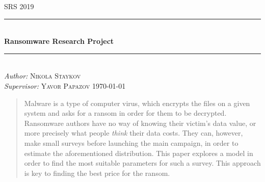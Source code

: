 \documentclass[11pt, a4paper]{article}
\theoremstyle{definition}
\begin{document}
\begin{titlepage}
	\newcommand{\HRule}{\rule{\linewidth}{0.5mm}}
	\centering
	\textsc{\LARGE SRS 2019}\\[1cm]
	\HRule\\[1 cm]
	
	{\huge\bfseries Ransomware Research Project }\\[0.5 cm] 
	\HRule\\
    \vfill
			\Large
			\textit{Author:}
			 \textsc{Nikola Staykov}\\
             \vspace{2cm}
			\Large
			\textit{Supervisor:}
            \textsc{Yavor Papazov}
    \vfill	
	{\large\today}   
	\vfill
\end{titlepage}

\tableofcontents
\newpage
\begin{abstract}
		Malware is a type of computer virus, which encrypts the files on a given system and asks for a ransom in order for them to be decrypted. Ransomware authors have no way of knowing their victim's data value, or more precisely what people \textit{think} their data costs. They can, however, make small surveys before launching the main campaign, in order to estimate the aforementioned distribution. This paper explores a model in order to find the most suitable parameters for such a survey. This approach is key to finding the best price for the ransom.
\end{abstract}
\end{document}
